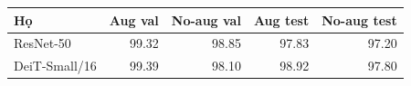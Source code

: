 \begin{tabular}{lrrrr}
\toprule
Họ & Aug val & No-aug val & Aug test & No-aug test\\
\midrule
ResNet-50 & 99.32 & 98.85 & 97.83 & 97.20\\
DeiT-Small/16 & 99.39 & 98.10 & 98.92 & 97.80\\
\bottomrule
\end{tabular}
